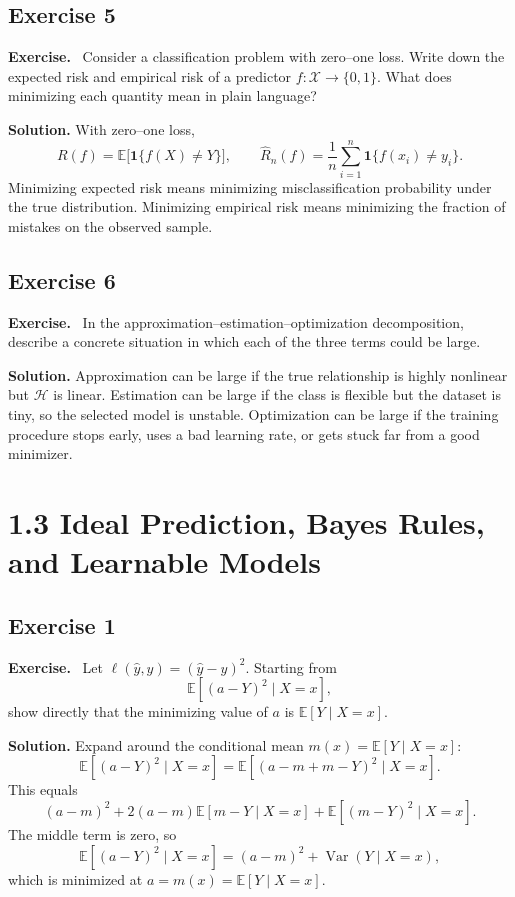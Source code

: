 \documentclass[11pt]{article}
\newenvironment{exercisebox}{\begin{framed}\noindent\textbf{Exercise.}\ }{\end{framed}}
\begin{document}
\subsection*{Exercise 5}
\begin{exercisebox}
Consider a classification problem with zero--one loss. Write down the expected risk and empirical risk of a predictor $f:\mathcal X\to\{0,1\}$. What does minimizing each quantity mean in plain language?
\end{exercisebox}
\textbf{Solution.} With zero--one loss,
\[
R(f)=\mathbb E\big[\mathbf 1\{f(X)\neq Y\}\big],\qquad
\widehat R_n(f)=\frac1n\sum_{i=1}^n \mathbf 1\{f(x_i)\neq y_i\}.
\]
Minimizing expected risk means minimizing misclassification probability under the true distribution. Minimizing empirical risk means minimizing the fraction of mistakes on the observed sample.

\subsection*{Exercise 6}
\begin{exercisebox}
In the approximation--estimation--optimization decomposition, describe a concrete situation in which each of the three terms could be large.
\end{exercisebox}
\textbf{Solution.} Approximation can be large if the true relationship is highly nonlinear but $\mathcal H$ is linear. Estimation can be large if the class is flexible but the dataset is tiny, so the selected model is unstable. Optimization can be large if the training procedure stops early, uses a bad learning rate, or gets stuck far from a good minimizer.

\section{1.3 Ideal Prediction, Bayes Rules, and Learnable Models}
\subsection*{Exercise 1}
\begin{exercisebox}
Let $\ell(\hat y,y)=(\hat y-y)^2$. Starting from
\[
\mathbb E[(a-Y)^2\mid X=x],
\]
show directly that the minimizing value of $a$ is $\mathbb E[Y\mid X=x]$.
\end{exercisebox}
\textbf{Solution.} Expand around the conditional mean $m(x)=\mathbb E[Y\mid X=x]$:
\[
\mathbb E[(a-Y)^2\mid X=x]=\mathbb E[(a-m+m-Y)^2\mid X=x].
\]
This equals
\[
(a-m)^2+2(a-m)\mathbb E[m-Y\mid X=x]+\mathbb E[(m-Y)^2\mid X=x].
\]
The middle term is zero, so
\[
\mathbb E[(a-Y)^2\mid X=x]=(a-m)^2+\operatorname{Var}(Y\mid X=x),
\]
which is minimized at $a=m(x)=\mathbb E[Y\mid X=x]$.
\end{document}
